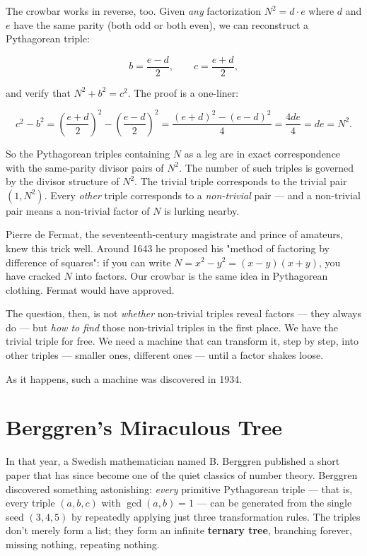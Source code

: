\documentclass[11pt,twoside,openright]{book}
\theoremstyle{definition}
\theoremstyle{remark}
\begin{document}
The crowbar works in reverse, too. Given \textit{any} factorization $N^2 = d \cdot e$ where $d$ and $e$ have the same parity (both odd or both even), we can reconstruct a Pythagorean triple:

\[b = \frac{e - d}{2}, \qquad c = \frac{e + d}{2},\]

and verify that $N^2 + b^2 = c^2$. The proof is a one-liner:

\[c^2 - b^2 = \left(\frac{e+d}{2}\right)^{\!2} - \left(\frac{e-d}{2}\right)^{\!2} = \frac{(e+d)^2 - (e-d)^2}{4} = \frac{4de}{4} = de = N^2.\]

So the Pythagorean triples containing $N$ as a leg are in exact correspondence with the same-parity divisor pairs of $N^2$. The number of such triples is governed by the divisor structure of $N^2$. The trivial triple corresponds to the trivial pair $(1, N^2)$. Every \textit{other} triple corresponds to a \textit{non-trivial} pair --- and a non-trivial pair means a non-trivial factor of $N$ is lurking nearby.

Pierre de Fermat, the seventeenth-century magistrate and prince of amateurs, knew this trick well. Around 1643 he proposed his "method of factoring by difference of squares": if you can write $N = x^2 - y^2 = (x-y)(x+y)$, you have cracked $N$ into factors. Our crowbar is the same idea in Pythagorean clothing. Fermat would have approved.


The question, then, is not \textit{whether} non-trivial triples reveal factors --- they always do --- but \textit{how to find} those non-trivial triples in the first place. We have the trivial triple for free. We need a machine that can transform it, step by step, into other triples --- smaller ones, different ones --- until a factor shakes loose.

As it happens, such a machine was discovered in 1934.


\section{Berggren's Miraculous Tree}

In that year, a Swedish mathematician named B. Berggren published a short paper that has since become one of the quiet classics of number theory. Berggren discovered something astonishing: \textit{every} primitive Pythagorean triple --- that is, every triple $(a, b, c)$ with $\gcd(a, b) = 1$ --- can be generated from the single seed $(3, 4, 5)$ by repeatedly applying just three transformation rules. The triples don't merely form a list; they form an infinite \textbf{ternary tree}, branching forever, missing nothing, repeating nothing.
\end{document}
